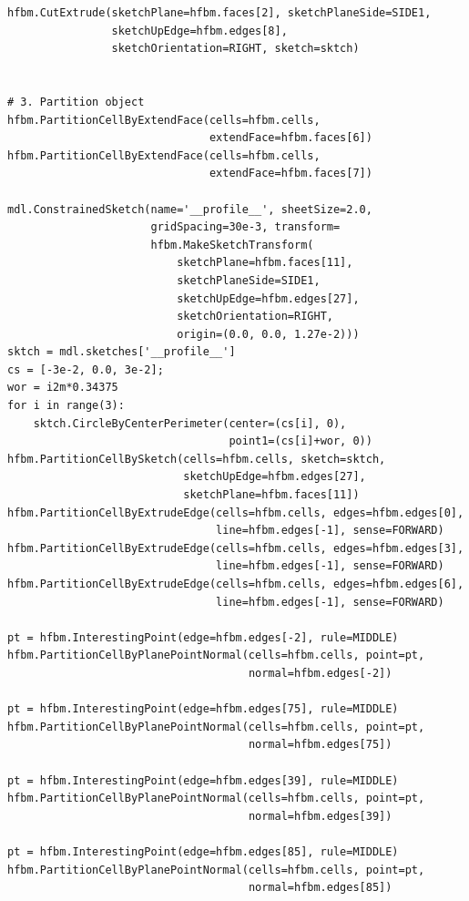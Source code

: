 \documentclass[11pt]{article}
\begin{document}
\begin{enumerate}
\begin{verbatim}
hfbm.CutExtrude(sketchPlane=hfbm.faces[2], sketchPlaneSide=SIDE1,
                sketchUpEdge=hfbm.edges[8],
                sketchOrientation=RIGHT, sketch=sktch)


# 3. Partition object
hfbm.PartitionCellByExtendFace(cells=hfbm.cells,
                               extendFace=hfbm.faces[6])
hfbm.PartitionCellByExtendFace(cells=hfbm.cells,
                               extendFace=hfbm.faces[7])

mdl.ConstrainedSketch(name='__profile__', sheetSize=2.0,
                      gridSpacing=30e-3, transform=
                      hfbm.MakeSketchTransform(
                          sketchPlane=hfbm.faces[11],
                          sketchPlaneSide=SIDE1,
                          sketchUpEdge=hfbm.edges[27],
                          sketchOrientation=RIGHT,
                          origin=(0.0, 0.0, 1.27e-2)))
sktch = mdl.sketches['__profile__']
cs = [-3e-2, 0.0, 3e-2];
wor = i2m*0.34375
for i in range(3):
    sktch.CircleByCenterPerimeter(center=(cs[i], 0),
                                  point1=(cs[i]+wor, 0))
hfbm.PartitionCellBySketch(cells=hfbm.cells, sketch=sktch,
                           sketchUpEdge=hfbm.edges[27],
                           sketchPlane=hfbm.faces[11])
hfbm.PartitionCellByExtrudeEdge(cells=hfbm.cells, edges=hfbm.edges[0],
                                line=hfbm.edges[-1], sense=FORWARD)
hfbm.PartitionCellByExtrudeEdge(cells=hfbm.cells, edges=hfbm.edges[3],
                                line=hfbm.edges[-1], sense=FORWARD)
hfbm.PartitionCellByExtrudeEdge(cells=hfbm.cells, edges=hfbm.edges[6],
                                line=hfbm.edges[-1], sense=FORWARD)

pt = hfbm.InterestingPoint(edge=hfbm.edges[-2], rule=MIDDLE)
hfbm.PartitionCellByPlanePointNormal(cells=hfbm.cells, point=pt,
                                     normal=hfbm.edges[-2])

pt = hfbm.InterestingPoint(edge=hfbm.edges[75], rule=MIDDLE)
hfbm.PartitionCellByPlanePointNormal(cells=hfbm.cells, point=pt,
                                     normal=hfbm.edges[75])

pt = hfbm.InterestingPoint(edge=hfbm.edges[39], rule=MIDDLE)
hfbm.PartitionCellByPlanePointNormal(cells=hfbm.cells, point=pt,
                                     normal=hfbm.edges[39])

pt = hfbm.InterestingPoint(edge=hfbm.edges[85], rule=MIDDLE)
hfbm.PartitionCellByPlanePointNormal(cells=hfbm.cells, point=pt,
                                     normal=hfbm.edges[85])


\end{verbatim}
\end{enumerate}
\end{document}

